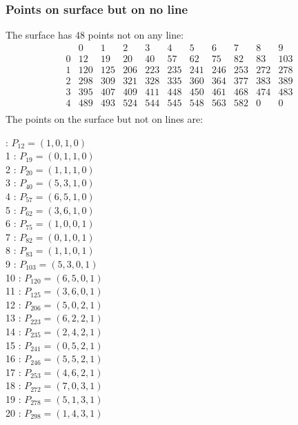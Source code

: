 \documentclass{article}
\begin{document}
{\subsubsection*{Points on surface but on no line}
The surface has 48 points not on any line:\\
$$
\begin{array}{r|*{10}{r}}
 & 0 & 1 & 2 & 3 & 4 & 5 & 6 & 7 & 8 & 9\\
\hline
0 & 12 & 19 & 20 & 40 & 57 & 62 & 75 & 82 & 83 & 103\\
1 & 120 & 125 & 206 & 223 & 235 & 241 & 246 & 253 & 272 & 278\\
2 & 298 & 309 & 321 & 328 & 335 & 360 & 364 & 377 & 383 & 389\\
3 & 395 & 407 & 409 & 411 & 448 & 450 & 461 & 468 & 474 & 483\\
4 & 489 & 493 & 524 & 544 & 545 & 548 & 563 & 582 & 0 & 0\\
\end{array}
$$
The points on the surface but not on lines are:\\
\begin{multicols}{2}
 : $P_{12}=( 1, 0, 1, 0 )$\\
1 : $P_{19}=( 0, 1, 1, 0 )$\\
2 : $P_{20}=( 1, 1, 1, 0 )$\\
3 : $P_{40}=( 5, 3, 1, 0 )$\\
4 : $P_{57}=( 6, 5, 1, 0 )$\\
5 : $P_{62}=( 3, 6, 1, 0 )$\\
6 : $P_{75}=( 1, 0, 0, 1 )$\\
7 : $P_{82}=( 0, 1, 0, 1 )$\\
8 : $P_{83}=( 1, 1, 0, 1 )$\\
9 : $P_{103}=( 5, 3, 0, 1 )$\\
10 : $P_{120}=( 6, 5, 0, 1 )$\\
11 : $P_{125}=( 3, 6, 0, 1 )$\\
12 : $P_{206}=( 5, 0, 2, 1 )$\\
13 : $P_{223}=( 6, 2, 2, 1 )$\\
14 : $P_{235}=( 2, 4, 2, 1 )$\\
15 : $P_{241}=( 0, 5, 2, 1 )$\\
16 : $P_{246}=( 5, 5, 2, 1 )$\\
17 : $P_{253}=( 4, 6, 2, 1 )$\\
18 : $P_{272}=( 7, 0, 3, 1 )$\\
19 : $P_{278}=( 5, 1, 3, 1 )$\\
20 : $P_{298}=( 1, 4, 3, 1 )$\\

\end{multicols}}
\end{document}
